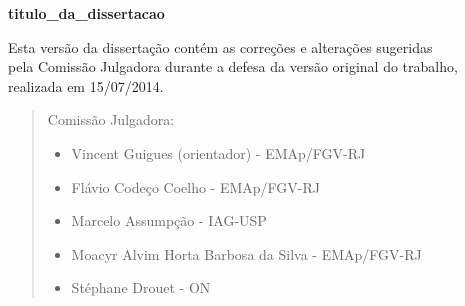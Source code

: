 \documentclass[12pt,twoside,a4paper]{book}
\numberwithin{equation}{section}
\begin{document}




%
%
%
%
\newpage
\thispagestyle{empty}
     \begin{center}
         \vspace*{2.3 cm}
         \textbf{\Large{\glsdesc*{titulo_da_dissertacao}}}\\
         \vspace*{2 cm}
     \end{center}
% 
     \vskip 2cm
% 
     \begin{flushright}
 	Esta versão da dissertação contém as correções e alterações sugeridas\\
 	pela Comissão Julgadora durante a defesa da versão original do trabalho,\\
 	realizada em 15/07/2014. 
     \vskip 2cm
% 
     \end{flushright}
     \vskip 4.2cm
% 
     \begin{quote}
     \noindent Comissão Julgadora:
%     
     \begin{itemize}
 		\item Vincent Guigues (orientador) - EMAp/FGV-RJ 
 		\item Flávio Codeço Coelho - EMAp/FGV-RJ 
 		\item Marcelo Assumpção - IAG-USP 
 		\item Moacyr Alvim Horta Barbosa da Silva - EMAp/FGV-RJ 
 		\item Stéphane Drouet - ON 
     \end{itemize}
%       
     \end{quote}
 \pagebreak

\newpage
\thispagestyle{empty}
\end{document}
